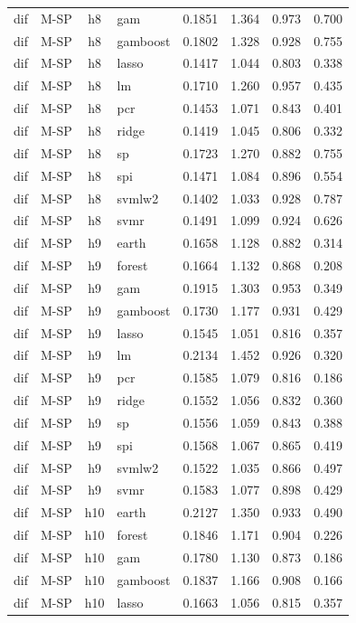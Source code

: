 \begin{ThreePartTable}
\begin{longtable}[t]{llclcccc}
dif & M-SP & h8 & gam & 0.1851 & 1.364 & 0.973 & 0.700\\
dif & M-SP & h8 & gamboost & 0.1802 & 1.328 & 0.928 & 0.755\\
dif & M-SP & h8 & lasso & 0.1417 & 1.044 & 0.803 & 0.338\\
dif & M-SP & h8 & lm & 0.1710 & 1.260 & 0.957 & 0.435\\
dif & M-SP & h8 & pcr & 0.1453 & 1.071 & 0.843 & 0.401\\
dif & M-SP & h8 & ridge & 0.1419 & 1.045 & 0.806 & 0.332\\
dif & M-SP & h8 & sp & 0.1723 & 1.270 & 0.882 & 0.755\\
dif & M-SP & h8 & spi & 0.1471 & 1.084 & 0.896 & 0.554\\
dif & M-SP & h8 & svmlw2 & 0.1402 & 1.033 & 0.928 & 0.787\\
dif & M-SP & h8 & svmr & 0.1491 & 1.099 & 0.924 & 0.626\\
\addlinespace
dif & M-SP & h9 & earth & 0.1658 & 1.128 & 0.882 & 0.314\\
dif & M-SP & h9 & forest & 0.1664 & 1.132 & 0.868 & 0.208\\
dif & M-SP & h9 & gam & 0.1915 & 1.303 & 0.953 & 0.349\\
dif & M-SP & h9 & gamboost & 0.1730 & 1.177 & 0.931 & 0.429\\
dif & M-SP & h9 & lasso & 0.1545 & 1.051 & 0.816 & 0.357\\
dif & M-SP & h9 & lm & 0.2134 & 1.452 & 0.926 & 0.320\\
dif & M-SP & h9 & pcr & 0.1585 & 1.079 & 0.816 & 0.186\\
dif & M-SP & h9 & ridge & 0.1552 & 1.056 & 0.832 & 0.360\\
dif & M-SP & h9 & sp & 0.1556 & 1.059 & 0.843 & 0.388\\
dif & M-SP & h9 & spi & 0.1568 & 1.067 & 0.865 & 0.419\\
dif & M-SP & h9 & svmlw2 & 0.1522 & 1.035 & 0.866 & 0.497\\
dif & M-SP & h9 & svmr & 0.1583 & 1.077 & 0.898 & 0.429\\
\addlinespace
dif & M-SP & h10 & earth & 0.2127 & 1.350 & 0.933 & 0.490\\
dif & M-SP & h10 & forest & 0.1846 & 1.171 & 0.904 & 0.226\\
dif & M-SP & h10 & gam & 0.1780 & 1.130 & 0.873 & 0.186\\
dif & M-SP & h10 & gamboost & 0.1837 & 1.166 & 0.908 & 0.166\\
dif & M-SP & h10 & lasso & 0.1663 & 1.056 & 0.815 & 0.357\\

\end{longtable}
\end{ThreePartTable}
